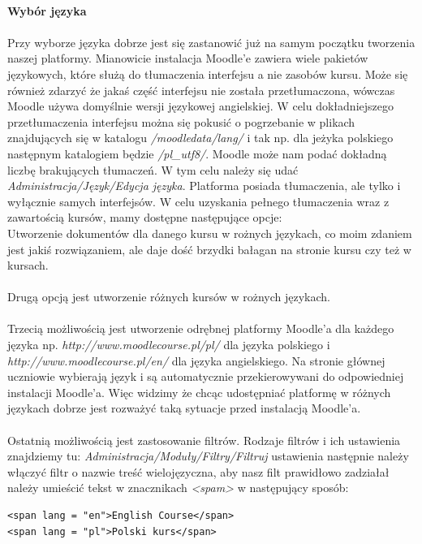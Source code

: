 \ \\
\textbf{Wybór języka}\\
\ \\
Przy wyborze języka dobrze jest się zastanowić już na samym początku tworzenia naszej platformy. Mianowicie instalacja Moodle'e zawiera wiele pakietów językowych, które służą do tłumaczenia interfejsu a nie zasobów kursu. Może się również zdarzyć że jakaś część interfejsu nie została przetłumaczona, wówczas Moodle używa domyślnie wersji językowej angielskiej. W celu dokładniejszego przetłumaczenia interfejsu można się pokusić o pogrzebanie w plikach znajdujących się w katalogu \textit{/moodledata/lang/} i tak np. dla jeżyka polskiego następnym katalogiem będzie \textit{/pl\_utf8/}. Moodle może nam podać dokładną liczbę brakujących tłumaczeń. W tym celu należy się udać \textit{Administracja/Język/Edycja języka}. Platforma posiada tłumaczenia, ale tylko i wyłącznie samych interfejsów. W celu uzyskania pełnego tłumaczenia wraz z zawartością kursów, mamy dostępne następujące opcje: \\
Utworzenie dokumentów dla danego kursu w rożnych językach, co moim zdaniem jest jakiś rozwiązaniem, ale daje dość brzydki bałagan na stronie kursu czy też w kursach. \\
\ \\
Drugą opcją jest utworzenie różnych kursów w rożnych językach.\\
\ \\
Trzecią możliwością jest utworzenie odrębnej platformy Moodle'a dla każdego języka np. \textit{http://www.moodlecourse.pl/pl/} dla języka polskiego i \textit{http://www.moodlecourse.pl/en/} dla języka angielskiego. Na stronie głównej uczniowie wybierają język i są automatycznie przekierowywani do odpowiedniej instalacji Moodle'a. Więc widzimy że chcąc udostępniać platformę w różnych językach dobrze jest rozważyć taką sytuacje przed instalacją Moodle'a. \\
\  \\
Ostatnią możliwością jest zastosowanie filtrów. Rodzaje filtrów i ich ustawienia znajdziemy tu: \textit{Administracja/Moduły/Filtry/Filtruj} ustawienia następnie należy włączyć filtr o nazwie treść wielojęzyczna, aby nasz filt prawidłowo zadziałał należy umieścić tekst w znacznikach \textit{<spam>} w następujący sposób:\\
\begin{verbatim}
<span lang = "en">English Course</span>
<span lang = "pl">Polski kurs</span>   
\end{verbatim}

